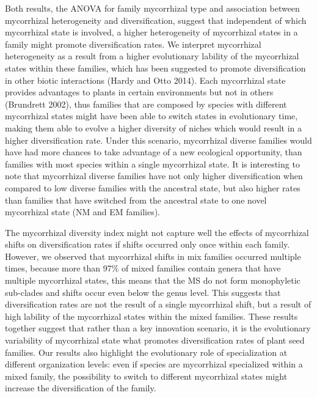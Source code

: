 \documentclass[12pt,]{article}
\begin{document}
Both results, the ANOVA for family mycorrhizal type and association
between mycorrhizal heterogeneity and diversification, suggest that
independent of which mycorrhizal state is involved, a higher
heterogeneity of mycorrhizal states in a family might promote
diversification rates. We interpret mycorrhizal heterogeneity as a
result from a higher evolutionary lability of the mycorrhizal states
within these families, which has been suggested to promote
diversification in other biotic interactions (Hardy and Otto 2014). Each
mycorrhizal state provides advantages to plants in certain environments
but not in others (Brundrett 2002), thus families that are composed by
species with different mycorrhizal states might have been able to switch
states in evolutionary time, making them able to evolve a higher
diversity of niches which would result in a higher diversification rate.
Under this scenario, mycorrhizal diverse families would have had more
chances to take advantage of a new ecological opportunity, than families
with most species within a single mycorrhizal state. It is interesting
to note that mycorrhizal diverse families have not only higher
diversification when compared to low diverse families with the ancestral
state, but also higher rates than families that have switched from the
ancestral state to one novel mycorrhizal state (NM and EM families).

The mycorrhizal diversity index might not capture well the effects of
mycorrhizal shifts on diversification rates if shifts occurred only once
within each family. However, we observed that mycorrhizal shifts in mix
families occurred multiple times, because more than 97\% of mixed
families contain genera that have multiple mycorrhizal states, this
means that the MS do not form monophyletic sub-clades and shifts occur
even below the genus level. This suggests that diversification rates are
not the result of a single mycorrhizal shift, but a result of high
lability of the mycorrhizal states within the mixed families. These
results together suggest that rather than a key innovation scenario, it
is the evolutionary variability of mycorrhizal state what promotes
diversification rates of plant seed families. Our results also highlight
the evolutionary role of specialization at different organization
levels: even if species are mycorrhizal specialized within a mixed
family, the possibility to switch to different mycorrhizal states might
increase the diversification of the family.
\end{document}
